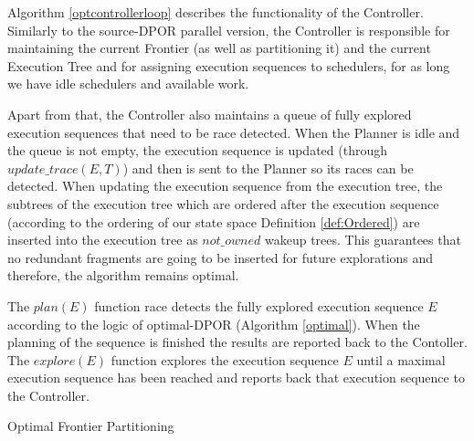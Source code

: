 Algorithm \ref{optcontrollerloop} describes the functionality of the Controller. Similarly to the source-DPOR parallel version,
the Controller is responsible for maintaining the current Frontier (as well as partitioning it) and the current Execution Tree
and for assigning execution sequences to schedulers, for as long we have idle schedulers and available work.

Apart from that, the Controller also maintains a queue of fully explored execution sequences that need to be race detected.
When the Planner is idle and the queue is not empty, the execution sequence is updated (through $update\_trace(E,T)$)
and then is sent to the Planner so its races can be detected. When updating the execution sequence from the execution tree,
the subtrees of the execution tree which are ordered after the execution sequence (according to the ordering of our state
space Definition \ref{def:Ordered}) are inserted into the execution tree as $not\_owned$ wakeup trees. This guarantees
that no redundant fragments are going to be inserted for future explorations and therefore, the algorithm remains optimal. 

The $plan(E)$ function race detects the fully explored execution sequence $E$ according to the logic of optimal-DPOR 
(Algorithm \ref{optimal}). When the planning of the sequence is finished the results are reported back to the Contoller.
The $explore(E)$ function explores the execution sequence $E$ until a maximal execution sequence
has been reached and reports back that execution sequence to the Controller.


\begin{algorithm}
    \caption{Optimal Frontier Partitioning}
    \label{optpartition}

\end{algorithm}

